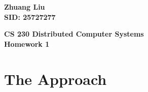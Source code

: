 \documentclass{article}%
\begin{document}
\begin{flushright}
\begin{LARGE}

\textbf{Zhuang Liu \\
SID: 25727277}
\end{LARGE}
\end{flushright}

\begin{center}
\begin{huge}
\textbf{CS 230 Distributed Computer Systems \\
Homework 1} \\
\end{huge}
\end{center}

\section{The Approach}
\end{document}
